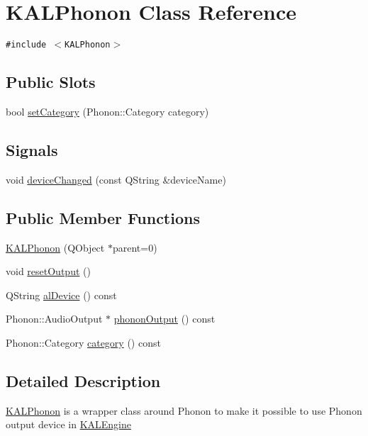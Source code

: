 \hypertarget{class_k_a_l_phonon}{
\section{KALPhonon Class Reference}
\label{class_k_a_l_phonon}
}
{\tt \#include $<$KALPhonon$>$}

\subsection*{Public Slots}
\begin{CompactItemize}
\item 
bool \hyperlink{class_k_a_l_phonon_782de15cc855babdf4c83fc7b3f8a413}{setCategory} (Phonon::Category category)
\end{CompactItemize}
\subsection*{Signals}
\begin{CompactItemize}
\item 
void \hyperlink{class_k_a_l_phonon_0f2beec9824c6d1a152175d0ee7054ef}{deviceChanged} (const QString \&deviceName)
\end{CompactItemize}
\subsection*{Public Member Functions}
\begin{CompactItemize}
\item 
\hyperlink{class_k_a_l_phonon_53e58c6459b6ddafc2ecaea52ad72168}{KALPhonon} (QObject $\ast$parent=0)
\item 
void \hyperlink{class_k_a_l_phonon_30b35bbed8cd7fd3d06d4741a1a2ce11}{resetOutput} ()
\item 
QString \hyperlink{class_k_a_l_phonon_9177f057918193079d7e65394191d7e7}{alDevice} () const 
\item 
Phonon::AudioOutput $\ast$ \hyperlink{class_k_a_l_phonon_4124b8a002123f93d81a52e10f1e32e5}{phononOutput} () const 
\item 
Phonon::Category \hyperlink{class_k_a_l_phonon_06a761e1d2ee5e9167eae70d87f6ebd3}{category} () const 
\end{CompactItemize}


\subsection{Detailed Description}
\hyperlink{class_k_a_l_phonon}{KALPhonon} is a wrapper class around Phonon to make it possible to use Phonon output device in \hyperlink{class_k_a_l_engine}{KALEngine} 


